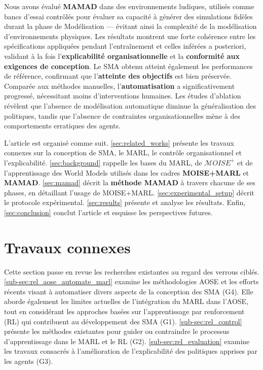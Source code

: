 \documentclass[pdflatex,sn-mathphys-num]{sn-jnl}%
\theoremstyle{thmstyleone}%
\theoremstyle{thmstyletwo}%
\theoremstyle{thmstylethree}%
\begin{document}
Nous avons évalué \textbf{MAMAD} dans des environnements ludiques, utilisés comme bancs d'essai contrôlés pour évaluer sa capacité à générer des simulations fidèles durant la phase de Modélisation — évitant ainsi la complexité de la modélisation d'environnements physiques. Les résultats montrent une forte cohérence entre les spécifications appliquées pendant l'entraînement et celles inférées a posteriori, validant à la fois l'\textbf{explicabilité organisationnelle} et la \textbf{conformité aux exigences de conception}. Le SMA obtenu atteint également les performances de référence, confirmant que l'\textbf{atteinte des objectifs} est bien préservée. Comparée aux méthodes manuelles, l'\textbf{automatisation} a significativement progressé, nécessitant moins d'interventions humaines. Les études d'ablation révèlent que l'absence de modélisation automatique diminue la généralisation des politiques, tandis que l'absence de contraintes organisationnelles mène à des comportements erratiques des agents.

\vspace{0.5em}

L'article est organisé comme suit. \autoref{sec:related_works} présente les travaux connexes sur la conception de SMA, le MARL, le contrôle organisationnel et l'explicabilité. \autoref{sec:background} rappelle les bases du MARL, de $\mathcal{M}OISE^+$ et de l'apprentissage des World Models utilisés dans les cadres \textbf{MOISE+MARL} et \textbf{MAMAD}. \autoref{sec:mamad} décrit la \textbf{méthode MAMAD} à travers chacune de ses phases, en détaillant l'usage de MOISE+MARL. \autoref{sec:experimental_setup} décrit le protocole expérimental. \autoref{sec:results} présente et analyse les résultats. Enfin, \autoref{sec:conclusion} conclut l'article et esquisse les perspectives futures.


\section{Travaux connexes}\label{sec:related_works}

Cette section passe en revue les recherches existantes au regard des verrous ciblés. \autoref{sub-sec:rel_aose_automate_marl} examine les méthodologies AOSE et les efforts récents visant à automatiser divers aspects de la conception des SMA (G4). Elle aborde également les limites actuelles de l'intégration du MARL dans l'AOSE, tout en considérant les approches basées sur l'apprentissage par renforcement (RL) qui contribuent au développement des SMA (G1). \autoref{sub-sec:rel_control} présente les méthodes existantes pour guider ou contraindre le processus d'apprentissage dans le MARL et le RL (G2).
\autoref{sub-sec:rel_evaluation} examine les travaux consacrés à l'amélioration de l'explicabilité des politiques apprises par les agents (G3).
\end{document}
